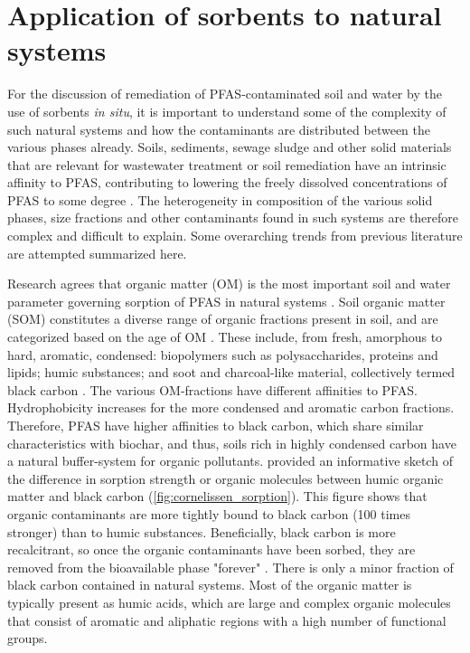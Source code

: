 \section{Application of sorbents to natural systems \label{sec:attenuation}}
For the discussion of remediation of PFAS-contaminated soil and water by the use of sorbents \textit{in situ}, it is important to understand some of the complexity of such natural systems and how the contaminants are distributed between the various phases already. Soils, sediments, sewage sludge and other solid materials that are relevant for wastewater treatment or soil remediation have an intrinsic affinity to PFAS, contributing to lowering the freely dissolved concentrations of PFAS to some degree \citep{arvaniti2014,zhang2013sorption}. The heterogeneity in composition of the various solid phases, size fractions and other contaminants found in such systems are therefore complex and difficult to explain. Some overarching trends from previous literature are attempted summarized here. 

Research agrees that organic matter (OM) is the most important soil and water parameter governing sorption of PFAS in natural systems \citep{zareitalabad2013perfluorooctanoic}. Soil organic matter (SOM) constitutes a diverse range of organic fractions present in soil, and are categorized based on the age of OM \citep{Cornelissen2005}. These include, from fresh, amorphous to hard, aromatic, condensed: biopolymers such as polysaccharides, proteins and lipids; humic substances; and soot and charcoal-like material, collectively termed black carbon \citep{cornelissen2004sorption}. The various OM-fractions have different affinities to PFAS. Hydrophobicity increases for the more condensed and aromatic carbon fractions. Therefore, PFAS have higher affinities to black carbon, which share similar characteristics with biochar, and thus, soils rich in highly condensed carbon have a natural buffer-system for organic pollutants. \cite{Cornelissen2005} provided an informative sketch of the difference in sorption strength or organic molecules between humic organic matter and black carbon (\cref{fig:cornelissen_sorption}). This figure shows that organic contaminants are more tightly bound to black carbon (100 times stronger) than to humic substances. Beneficially, black carbon is more recalcitrant, so once the organic contaminants have been sorbed, they are removed from the bioavailable phase "forever" \citep{Cornelissen2006}. There is only a minor fraction of black carbon contained in natural systems. Most of the organic matter is typically present as humic acids, which are large and complex organic molecules that consist of aromatic and aliphatic regions with a high number of functional groups. 


